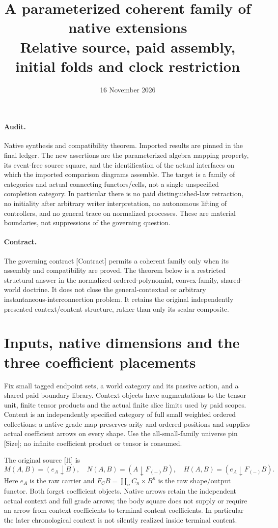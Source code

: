 \documentclass[11pt]{article}
\title{A parameterized coherent family of native extensions\\Relative source, paid assembly, initial folds and clock restriction}
\date{16 November 2026}
\begin{document}
\maketitle
\paragraph{Audit.} Native synthesis and compatibility theorem. Imported results are pinned in the final ledger. The new assertions are the parameterized algebra mapping property, its event-free source square, and the identification of the actual interfaces on which the imported comparison diagrams assemble. The target is a family of categories and actual connecting functors/cells, not a single unspecified completion category. In particular there is no paid distinguished-law retraction, no initiality after arbitrary writer interpretation, no autonomous lifting of controllers, and no general trace on normalized processes. These are material boundaries, not suppressions of the governing question.

\paragraph{Contract.} The governing contract [Contract] permits a coherent family only when its assembly and compatibility are proved. The theorem below is a restricted structural answer in the normalized ordered-polynomial, convex-family, shared-world doctrine. It does not close the general-contextad or arbitrary instantaneous-interconnection problem. It retains the original independently presented context/content structure, rather than only its scalar composite.

\section{Inputs, native dimensions and the three coefficient placements}
Fix small tagged endpoint sets, a world category and its passive action, and a shared paid boundary library. Context objects have augmentations to the tensor unit, finite tensor products and the actual finite slice limits used by paid scopes. Content is an independently specified category of full small weighted ordered collections: a native grade map preserves arity and ordered positions and supplies actual coefficient arrows on every shape. Use the all-small-family universe pin [Size]; no infinite coefficient product or tensor is consumed.

The original source [H] is
\[
 M(A,B)=(e_A\downarrow B),\quad N(A,B)=(A\downarrow F_{(-)}B),\quad
 H(A,B)=(e_A\downarrow F_{(-)}B).
\]
Here $e_A$ is the raw carrier and $F_CB=\coprod_nC_n\times B^n$ is the raw shape/output functor. Both forget coefficient objects. Native arrows retain the independent actual context and full grade arrows; the body square does not supply or require an arrow from context coefficients to terminal content coefficients. In particular the later chronological context is not silently realized inside terminal content.
\end{document}
